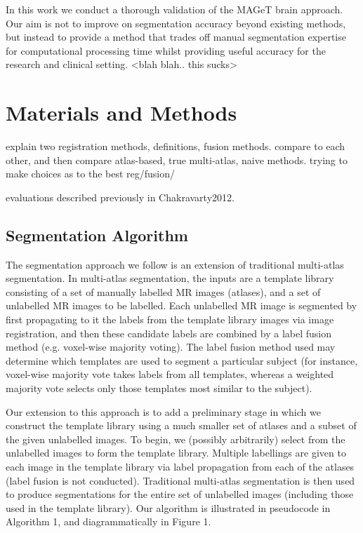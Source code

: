 \documentclass{article}\usepackage{graphicx, color}
\begin{document}
In this work we conduct a thorough validation of the MAGeT brain approach. Our aim is not to improve on segmentation accuracy beyond existing methods, but instead to provide a method that trades off manual segmentation expertise for computational processing time whilst providing useful accuracy for the research and clinical setting. <blah blah.. this sucks>

\section{Materials and Methods}
explain two registration methods, definitions, fusion methods. 
compare to each other, and then compare atlas-based, true multi-atlas, naive methods.
trying to make choices as to the best reg/fusion/

evaluations
described previously in Chakravarty2012. 

\subsection{Segmentation Algorithm}
The segmentation approach we follow is an extension of traditional multi-atlas segmentation. In multi-atlas segmentation, the inputs are a template library consisting of a set of manually labelled MR images (atlases), and a set of unlabelled MR images to be labelled.  Each unlabelled MR image is segmented by first propagating to it the labels from the template library images via image registration, and then these candidate labels are combined by a label fusion method (e.g. voxel-wise majority voting). The label fusion method used may determine which templates are used to segment a particular subject (for instance, voxel-wise majority vote takes labels from all templates, whereas a weighted majority vote selects only those templates most similar to the subject). 

Our extension to this approach is to add a preliminary stage in which we construct the template library using a much smaller set of atlases and a subset of the given unlabelled images.  To begin, we (possibly arbitrarily) select from the unlabelled images to form the template library.  Multiple labellings are given to each image in the template library via label propagation from each of the atlases (label fusion is not conducted).  Traditional multi-atlas segmentation is then used to produce segmentations for the entire set of unlabelled images (including those used in the template library).  Our algorithm is illustrated in pseudocode in Algorithm 1, and diagrammatically in Figure 1. 
\end{document}
